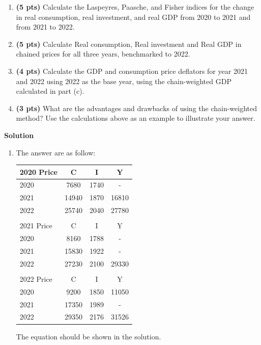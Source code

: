 \documentclass[14pt, oneside]{memoir}
\begin{document}
\begin{enumerate}[label=\textbf{\arabic*.}, itemsep=15pt]
\begin{enumerate}[label=(\alph*)]
	\item \textbf{(5  pts)}  Calculate the Laspeyres, Paasche, and Fisher indices for the change in real consumption, real investment, and real GDP from 2020 to 2021 and from 2021 to 2022.
	\vspace{10cm}
	\item \textbf{(5  pts)} Calculate Real consumption, Real investment and Real GDP in chained prices for all three years, benchmarked to 2022.
	\clearpage
	\item \textbf{(4  pts)} Calculate the GDP and consumption price deflators for year 2021 and 2022 using 2022 as the base year, using the chain-weighted GDP calculated in part (c).
	
	
	\vspace{12cm}
	\item \textbf{(3  pts)} What are the advantages and drawbacks of using the chain-weighted method? Use the calculations above as an example to illustrate your answer.
\end{enumerate}

\clearpage
\textbf{Solution}
\begin{enumerate}[label=(\alph*)]
	\item The answer are as follow:
	
	\begin{table}[htbp]
		\centering
		    \begin{tabular}{lccc}
			2020 Price & C     & I     & Y \\ \hline
			2020  & 7680  & 1740  & - \\
			2021  & 14940 & 1870  & 16810 \\
			2022  & 25740 & 2040  & 27780 \\ \hline
			&       &       &  \\
			2021 Price & C     & I     & Y \\ \hline
			2020  & 8160  & 1788  & - \\
			2021  & 15830 & 1922  & - \\
			2022  & 27230 & 2100  & 29330 \\ \hline
			&       &       &  \\
			2022 Price & C     & I     & Y \\ \hline
			2020  & 9200  & 1850  & 11050 \\
			2021  & 17350 & 1989  & - \\
			2022  & 29350 & 2176  & 31526 \\ \hline
		\end{tabular}%
	\end{table}%
	The equation should be shown in the solution.
	

\end{enumerate}
\end{enumerate}
\end{document}

